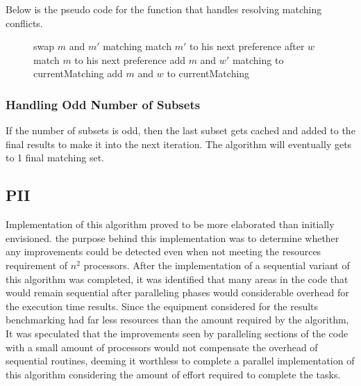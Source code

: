 Below is the pseudo code for the function that handles resolving matching conflicts.
\begin{figure}[!htb]
    
    \begin{algorithmic}
                    \STATE swap $m$ and $m\prime$ matching
                    \STATE match $m\prime$ to his next preference after $w$
                \ELSE
                    \STATE match $m$ to his next preference
                    \STATE add $m$ and $w\prime$ matching to currentMatching
                \ENDIF
            \ENDWHILE
        \ELSE
            \STATE add $m$ and $w$ to currentMatching
        \ENDIF
    \ENDFOR
    \end{algorithmic}
\end{figure}

\subsubsection{Handling Odd Number of Subsets }
If the number of subsets is odd, then the last subset gets cached and added to the final results to make it into the next iteration. The algorithm will eventually gets to 1 final matching set. 

\subsection{PII}
Implementation of this algorithm proved to be more elaborated than initially envisioned. the purpose behind this implementation was to determine whether any improvements could be detected even when not meeting the resources requirement of $n^2$ processors. After the implementation of a sequential variant of this algorithm was completed, it was identified that many areas in the code that would remain sequential after paralleling phases would considerable overhead for the execution time results. Since the equipment considered for the results benchmarking had far less resources than the amount required by the algorithm, It was speculated that the improvements seen by paralleling sections of the code with a small amount of processors would not compensate the overhead of sequential routines, deeming it worthless to complete a parallel implementation of this algorithm considering the amount of effort required to complete the tasks.

